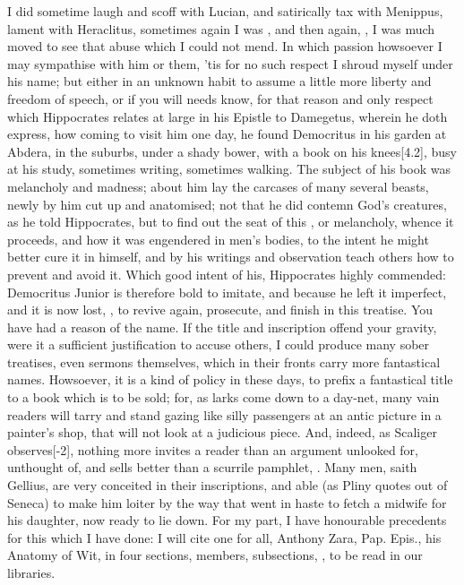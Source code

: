 {I did sometime laugh and scoff with Lucian, and satirically tax with
Menippus, lament with Heraclitus, sometimes again I was , and then again, , I was much
moved to see that abuse which I could not mend. In which passion
howsoever I may sympathise with him or them, 'tis for no such respect I
shroud myself under his name; but either in an unknown habit to assume
a little more liberty and freedom of speech, or if you will needs know,
for that reason and only respect which Hippocrates relates at large in
his Epistle to Damegetus, wherein he doth express, how coming to visit
him one day, he found Democritus in his garden at Abdera, in the
suburbs, under a shady bower, with a book on his knees[4.2\baselineskip], busy at
his study, sometimes writing, sometimes walking. The subject of his
book was melancholy and madness; about him lay the carcases of many
several beasts, newly by him cut up and anatomised; not that he did
contemn God's creatures, as he told Hippocrates, but to find out the
seat of this , or melancholy, whence it proceeds, and how it
was engendered in men's bodies, to the intent he might better cure it
in himself, and by his writings and observation teach others how to
prevent and avoid it. Which good intent of his, Hippocrates highly
commended: Democritus Junior is therefore bold to imitate, and because
he left it imperfect, and it is now lost, , to revive again, prosecute, and finish in this treatise.
You have had a reason of the name. If the title and inscription offend
your gravity, were it a sufficient justification to accuse others, I
could produce many sober treatises, even sermons themselves, which in
their fronts carry more fantastical names. Howsoever, it is a kind of
policy in these days, to prefix a fantastical title to a book which is
to be sold; for, as larks come down to a day-net, many vain readers
will tarry and stand gazing like silly passengers at an antic picture
in a painter's shop, that will not look at a judicious piece. And,
indeed, as Scaliger observes[-2\baselineskip], nothing more invites a reader than an
argument unlooked for, unthought of, and sells better than a scurrile
pamphlet, . Many men, saith
Gellius, are very conceited in their inscriptions, and able (as
Pliny quotes out of Seneca) to make him loiter by the way that went
in haste to fetch a midwife for his daughter, now ready to lie down.
For my part, I have honourable precedents for this which I have
done: I will cite one for all, Anthony Zara, Pap. Epis., his Anatomy of
Wit, in four sections, members, subsections, \etc, to be read in our
libraries.

}
